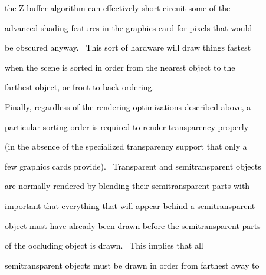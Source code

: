 \documentclass[a4paper]{article}
\newcommand\textstyleOOoComputerKeyWord[1]{\textrm{\textcolor[rgb]{0.0,0.0,0.5019608}{#1}}}
\begin{document}
{\color{black}
\textstyleOOoComputerKeyWord{\textcolor{black}{the Z-buffer algorithm can effectively short-circuit some of the}}}

{\color{black}
\textstyleOOoComputerKeyWord{\textcolor{black}{advanced shading features in the graphics card for pixels that would}}}

{\color{black}
\textstyleOOoComputerKeyWord{\textcolor{black}{be obscured anyway. \ This sort of hardware will draw things fastest}}}

{\color{black}
\textstyleOOoComputerKeyWord{\textcolor{black}{when the scene is sorted in order from the nearest object to the}}}

{\color{black}
\textstyleOOoComputerKeyWord{\textcolor{black}{farthest object, or {\textquotedbl}front-to-back{\textquotedbl}
ordering.}}}


\bigskip

{\color{black}
\textstyleOOoComputerKeyWord{\textcolor{black}{Finally, regardless of the rendering optimizations described above, a}}}

{\color{black}
\textstyleOOoComputerKeyWord{\textcolor{black}{particular sorting order is required to render transparency properly}}}

{\color{black}
\textstyleOOoComputerKeyWord{\textcolor{black}{(in the absence of the specialized transparency support that only a}}}

{\color{black}
\textstyleOOoComputerKeyWord{\textcolor{black}{few graphics cards provide). \ Transparent and semitransparent objects}}}

{\color{black}
\textstyleOOoComputerKeyWord{\textcolor{black}{are normally rendered by blending their semitransparent parts with}}}

\clearpage{\color{black}
\textstyleOOoComputerKeyWord{\textcolor{black}{what has already been drawn to the framebuffer, which means that it is}}}

{\color{black}
\textstyleOOoComputerKeyWord{\textcolor{black}{important that everything that will appear behind a semitransparent}}}

{\color{black}
\textstyleOOoComputerKeyWord{\textcolor{black}{object must have already been drawn before the semitransparent parts}}}

{\color{black}
\textstyleOOoComputerKeyWord{\textcolor{black}{of the occluding object is drawn. \ This implies that all}}}

{\color{black}
\textstyleOOoComputerKeyWord{\textcolor{black}{semitransparent objects must be drawn in order from farthest away to}}}
\end{document}
